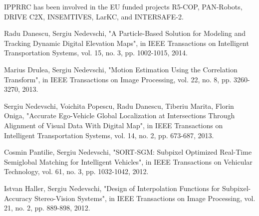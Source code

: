 IPPRRC has been involved in the EU funded projects R5-COP, PAN-Robots, DRIVE C2X, INSEMTIVES, LarKC, and INTERSAFE-2.

%
%
%
%
%


\begin{keypubs}{\CLUJ}
\item
Radu Danescu, Sergiu Nedevschi, "A Particle-Based Solution for Modeling and Tracking Dynamic Digital Elevation Maps", in IEEE 
Transactions on Intelligent Transportation Systems, vol. 15, no. 3, pp. 1002-1015, 2014.
\item
Marius Drulea, Sergiu Nedevschi, "Motion Estimation Using the Correlation Transform", in IEEE Transactions on Image Processing, vol. 22, no. 8, pp. 3260-3270, 2013.
\item
Sergiu Nedevschi, Voichita Popescu, Radu Danescu, Tiberiu Marita, Florin Oniga, "Accurate Ego-Vehicle Global Localization at 
Intersections Through Alignment of Visual Data With Digital Map", in IEEE 
Transactions on Intelligent Transportation Systems, 
vol. 14, no. 2, pp. 673-687, 2013.
\item
Cosmin Pantilie, Sergiu Nedevschi, "SORT-SGM: Subpixel Optimized Real-Time Semiglobal Matching for Intelligent Vehicles", in 
IEEE Transactions on Vehicular Technology, vol. 61, no. 3, pp. 1032-1042, 2012.
\item
Istvan Haller, Sergiu Nedevschi, "Design of Interpolation Functions for Subpixel-Accuracy Stereo-Vision Systems", in IEEE Transactions on Image Processing, vol. 21, no. 2, pp. 889-898, 2012.

\end{keypubs}

